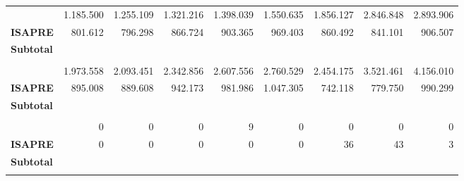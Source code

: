 \documentclass[
  letterpaper,
  DIV=11,
  numbers=noendperiod]{scrartcl}
\begin{document}
\begin{table}
\begin{tabular*}{\linewidth}{@{\extracolsep{\fill}}l|rrrrrrrr}
\midrule\addlinespace[2.5pt]
\multicolumn{9}{l}{{\bfseries Hombre}} \\[2.5pt] 
\midrule\addlinespace[2.5pt]
{\bfseries FONASA} & 1.185.500 & 1.255.109 & 1.321.216 & 1.398.039 & 1.550.635 & 1.856.127 & 2.846.848 & 2.893.906 \\ 
{\bfseries ISAPRE} & 801.612 & 796.298 & 866.724 & 903.365 & 969.403 & 860.492 & 841.101 & 906.507 \\ 
{\bfseries Subtotal} & {\bfseries \cellcolor[HTML]{F2F2F2}{1.987.112}} & {\bfseries \cellcolor[HTML]{F2F2F2}{2.051.407}} & {\bfseries \cellcolor[HTML]{F2F2F2}{2.187.940}} & {\bfseries \cellcolor[HTML]{F2F2F2}{2.301.404}} & {\bfseries \cellcolor[HTML]{F2F2F2}{2.520.038}} & {\bfseries \cellcolor[HTML]{F2F2F2}{2.716.619}} & {\bfseries \cellcolor[HTML]{F2F2F2}{3.687.949}} & {\bfseries \cellcolor[HTML]{F2F2F2}{3.800.413}} \\ 
\midrule\addlinespace[2.5pt]
\multicolumn{9}{l}{{\bfseries Mujer}} \\[2.5pt] 
\midrule\addlinespace[2.5pt]
{\bfseries FONASA} & 1.973.558 & 2.093.451 & 2.342.856 & 2.607.556 & 2.760.529 & 2.454.175 & 3.521.461 & 4.156.010 \\ 
{\bfseries ISAPRE} & 895.008 & 889.608 & 942.173 & 981.986 & 1.047.305 & 742.118 & 779.750 & 990.299 \\ 
{\bfseries Subtotal} & {\bfseries \cellcolor[HTML]{F2F2F2}{2.868.566}} & {\bfseries \cellcolor[HTML]{F2F2F2}{2.983.059}} & {\bfseries \cellcolor[HTML]{F2F2F2}{3.285.029}} & {\bfseries \cellcolor[HTML]{F2F2F2}{3.589.542}} & {\bfseries \cellcolor[HTML]{F2F2F2}{3.807.834}} & {\bfseries \cellcolor[HTML]{F2F2F2}{3.196.293}} & {\bfseries \cellcolor[HTML]{F2F2F2}{4.301.211}} & {\bfseries \cellcolor[HTML]{F2F2F2}{5.146.309}} \\ 
\midrule\addlinespace[2.5pt]
\multicolumn{9}{l}{{\bfseries Sin Información}} \\[2.5pt] 
\midrule\addlinespace[2.5pt]
{\bfseries FONASA} & 0 & 0 & 0 & 9 & 0 & 0 & 0 & 0 \\ 
{\bfseries ISAPRE} & 0 & 0 & 0 & 0 & 0 & 36 & 43 & 3 \\ 
{\bfseries Subtotal} & {\bfseries \cellcolor[HTML]{F2F2F2}{0}} & {\bfseries \cellcolor[HTML]{F2F2F2}{0}} & {\bfseries \cellcolor[HTML]{F2F2F2}{0}} & {\bfseries \cellcolor[HTML]{F2F2F2}{9}} & {\bfseries \cellcolor[HTML]{F2F2F2}{0}} & {\bfseries \cellcolor[HTML]{F2F2F2}{36}} & {\bfseries \cellcolor[HTML]{F2F2F2}{43}} & {\bfseries \cellcolor[HTML]{F2F2F2}{3}} \\ 
\midrule\addlinespace[2.5pt]

\end{tabular*}
\end{table}
\end{document}
